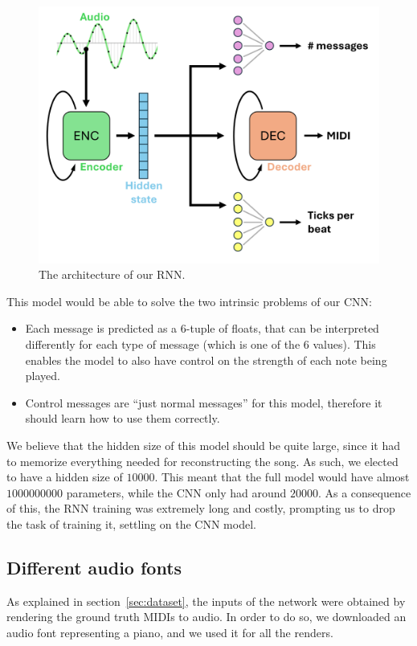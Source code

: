 \documentclass[10pt,twocolumn,letterpaper]{article}
\begin{document}
\begin{figure}[ht]
\begin{center}
   \includegraphics[width=0.8\linewidth]{images/RNN schema.png}
\end{center}
   \caption{The architecture of our RNN.}\label{fig:rnn}
\end{figure}

This model would be able to solve the two intrinsic problems of our CNN:
\begin{itemize}
    \item Each message is predicted as a 6-tuple of floats, that can be interpreted differently for each type of message (which is one of the \num{6} values). This enables the model to also have control on the strength of each note being played.
    \item Control messages are ``just normal messages'' for this model, therefore it should learn how to use them correctly.
\end{itemize}
We believe that the hidden size of this model should be quite large, since it had to memorize everything needed for reconstructing the song.
As such, we elected to have a hidden size of $\num{10000}$.
This meant that the full model would have almost $\num{1000000000}$ parameters, while the CNN only had around $\num{20000}$.
As a consequence of this, the RNN training was extremely long and costly, prompting us to drop the task of training it, settling on the CNN model.

\subsection{Different audio fonts}

As explained in section~\ref{sec:dataset}, the inputs of the network were obtained by rendering the ground truth MIDIs to audio.
In order to do so, we downloaded an audio font representing a piano, and we used it for all the renders.
\end{document}
